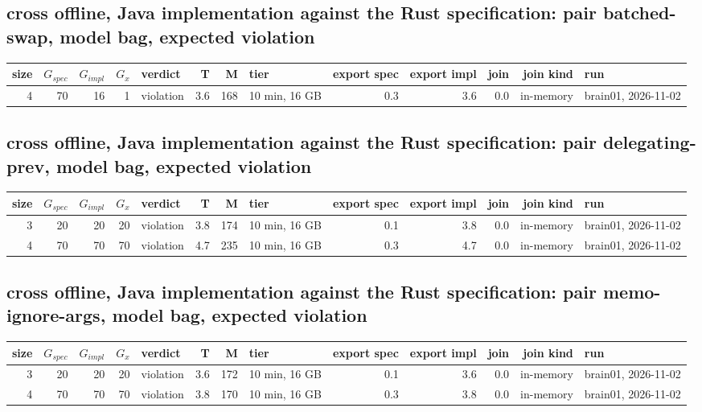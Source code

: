 \documentclass[10pt]{article}
\begin{document}
\subsection*{cross offline, Java implementation against the Rust specification: pair \textsf{batched-swap}, model bag, expected violation}
\begin{longtable}{@{}rrrrlrrlrrrrl@{}}
\toprule
size & $G_{\mathit{spec}}$ & $G_{\mathit{impl}}$ & $G_x$ & verdict & T & M & tier & export spec & export impl & join & join kind & run \\
\midrule
\endhead
\color{red} 4 & 70 & 16 & 1 & violation & 3.6 & 168 & 10 min, 16 GB & 0.3 & 3.6 & 0.0 & in-memory & brain01, 2026-11-02 \\
\bottomrule
\end{longtable}
\subsection*{cross offline, Java implementation against the Rust specification: pair \textsf{delegating-prev}, model bag, expected violation}
\begin{longtable}{@{}rrrrlrrlrrrrl@{}}
\toprule
size & $G_{\mathit{spec}}$ & $G_{\mathit{impl}}$ & $G_x$ & verdict & T & M & tier & export spec & export impl & join & join kind & run \\
\midrule
\endhead
\color{red} 3 & 20 & 20 & 20 & violation & 3.8 & 174 & 10 min, 16 GB & 0.1 & 3.8 & 0.0 & in-memory & brain01, 2026-11-02 \\
\color{red} 4 & 70 & 70 & 70 & violation & 4.7 & 235 & 10 min, 16 GB & 0.3 & 4.7 & 0.0 & in-memory & brain01, 2026-11-02 \\
\bottomrule
\end{longtable}
\subsection*{cross offline, Java implementation against the Rust specification: pair \textsf{memo-ignore-args}, model bag, expected violation}
\begin{longtable}{@{}rrrrlrrlrrrrl@{}}
\toprule
size & $G_{\mathit{spec}}$ & $G_{\mathit{impl}}$ & $G_x$ & verdict & T & M & tier & export spec & export impl & join & join kind & run \\
\midrule
\endhead
\color{red} 3 & 20 & 20 & 20 & violation & 3.6 & 172 & 10 min, 16 GB & 0.1 & 3.6 & 0.0 & in-memory & brain01, 2026-11-02 \\
\color{red} 4 & 70 & 70 & 70 & violation & 3.8 & 170 & 10 min, 16 GB & 0.3 & 3.8 & 0.0 & in-memory & brain01, 2026-11-02 \\
\bottomrule
\end{longtable}
\end{document}
